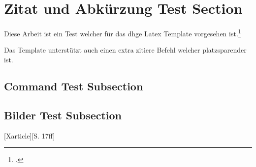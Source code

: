\section{Zitat und Abkürzung Test Section}

Diese Arbeit ist ein Test welcher f\"ur das \ac{dhge} Latex Template vorgesehen ist.\footcite{Xarticle}

Das Template unterstützt auch einen extra zitiere Befehl welcher platzsparender ist.\supercite{Xarticle}

\cleardoublepage

\subsection{Command Test Subsection}

\doubleunderline{$150\mathrm{\Omega}$}

\subsection{Bilder Test Subsection}

[Xarticle][S. 17ff]
